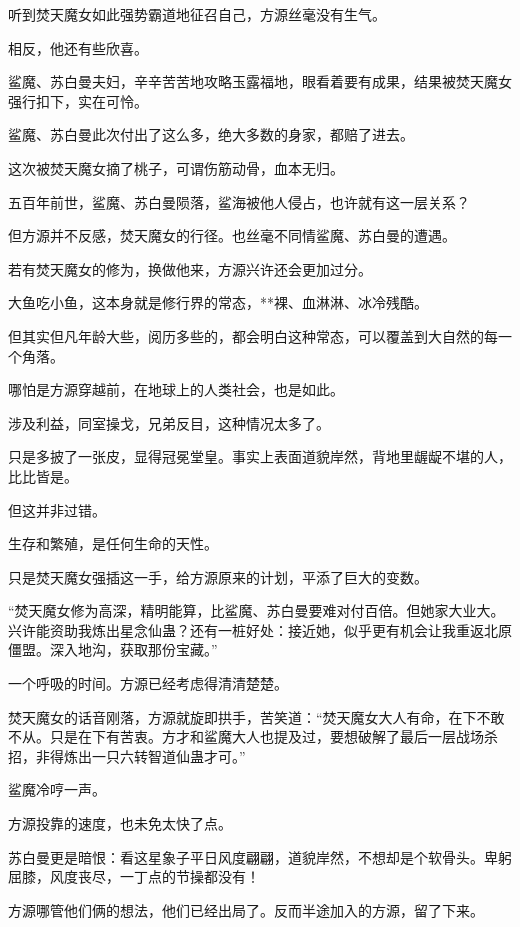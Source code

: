 
\begin{this_body}

听到焚天魔女如此强势霸道地征召自己，方源丝毫没有生气。

相反，他还有些欣喜。

鲨魔、苏白曼夫妇，辛辛苦苦地攻略玉露福地，眼看着要有成果，结果被焚天魔女强行扣下，实在可怜。

鲨魔、苏白曼此次付出了这么多，绝大多数的身家，都赔了进去。

这次被焚天魔女摘了桃子，可谓伤筋动骨，血本无归。

五百年前世，鲨魔、苏白曼陨落，鲨海被他人侵占，也许就有这一层关系？

但方源并不反感，焚天魔女的行径。也丝毫不同情鲨魔、苏白曼的遭遇。

若有焚天魔女的修为，换做他来，方源兴许还会更加过分。

大鱼吃小鱼，这本身就是修行界的常态，**裸、血淋淋、冰冷残酷。

但其实但凡年龄大些，阅历多些的，都会明白这种常态，可以覆盖到大自然的每一个角落。

哪怕是方源穿越前，在地球上的人类社会，也是如此。

涉及利益，同室操戈，兄弟反目，这种情况太多了。

只是多披了一张皮，显得冠冕堂皇。事实上表面道貌岸然，背地里龌龊不堪的人，比比皆是。

但这并非过错。

生存和繁殖，是任何生命的天性。

只是焚天魔女强插这一手，给方源原来的计划，平添了巨大的变数。

“焚天魔女修为高深，精明能算，比鲨魔、苏白曼要难对付百倍。但她家大业大。兴许能资助我炼出星念仙蛊？还有一桩好处：接近她，似乎更有机会让我重返北原僵盟。深入地沟，获取那份宝藏。”

一个呼吸的时间。方源已经考虑得清清楚楚。

焚天魔女的话音刚落，方源就旋即拱手，苦笑道：“焚天魔女大人有命，在下不敢不从。只是在下有苦衷。方才和鲨魔大人也提及过，要想破解了最后一层战场杀招，非得炼出一只六转智道仙蛊才可。”

鲨魔冷哼一声。

方源投靠的速度，也未免太快了点。

苏白曼更是暗恨：看这星象子平日风度翩翩，道貌岸然，不想却是个软骨头。卑躬屈膝，风度丧尽，一丁点的节操都没有！

方源哪管他们俩的想法，他们已经出局了。反而半途加入的方源，留了下来。


\end{this_body}

